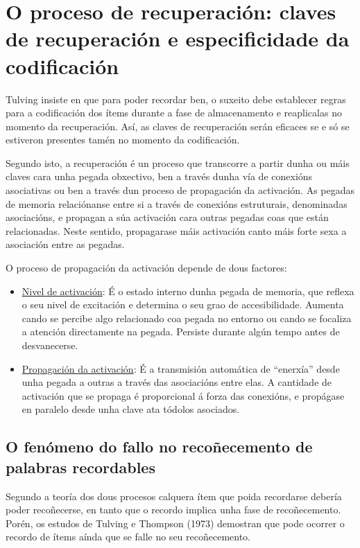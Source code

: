 \documentclass[a4paper,11pt]{article}
\begin{document}
\section{O proceso de recuperación: claves de recuperación e especificidade da codificación}
Tulving insiste en que para poder recordar ben, o suxeito debe establecer regras para a codificación dos ítems durante a fase de almacenamento e reaplicalas no momento da recuperación. Así, as claves de recuperación serán eficaces se e só se estiveron presentes tamén no momento da codificación. 

Segundo isto, a recuperación é un proceso que transcorre a partir dunha ou máis claves cara unha pegada obxectivo, ben a través dunha vía de conexións asociativas ou ben a través dun proceso de propagación da activación. As pegadas de memoria relaciónanse entre si a través de conexións estruturais, denominadas asociacións, e propagan a súa activación cara outras pegadas coas que están relacionadas. Neste sentido, propagarase máis activación canto máis forte sexa a asociación entre as pegadas. 

O proceso de propagación da activación depende de dous factores:
\begin{itemize}
	\item \underline{Nivel de activación}: É o estado interno dunha pegada de memoria, que reflexa o 
	seu nivel de excitación e determina o seu grao de accesibilidade. Aumenta cando se percibe algo 
	relacionado coa pegada no entorno ou cando se focaliza a atención directamente na pegada. 
	Persiste durante algún tempo antes de desvanecerse.
	\item \underline{Propagación da activación}: É a transmisión automática de ``enerxía'' desde 
	unha pegada a outras a través das asociacións entre elas. A cantidade de activación que se 
	propaga é proporcional á forza das conexións, e propágase en paralelo desde unha clave ata 
	tódolos asociados.
\end{itemize}

\subsection{O fenómeno do fallo no recoñecemento de palabras recordables}
Segundo a teoría dos dous procesos calquera ítem que poida recordarse debería poder recoñecerse, en tanto que o recordo implica unha fase de recoñecemento. Porén, os estudos de Tulving e Thompson (1973) demostran que pode ocorrer o recordo de ítems aínda que se falle no seu recoñecemento. 
\end{document}
